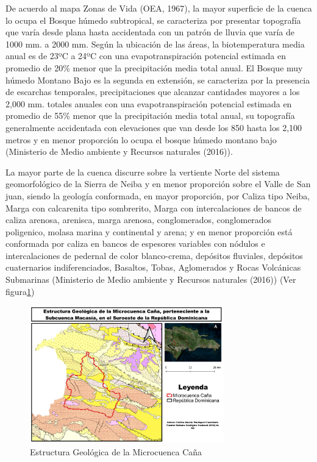 \documentclass[11pt,]{article}
\begin{document}
De acuerdo al mapa Zonas de Vida (OEA, 1967), la mayor superficie de la
cuenca lo ocupa el Bosque húmedo subtropical, se caracteriza por
presentar topografía que varía desde plana hasta accidentada con un
patrón de lluvia que varía de 1000 mm. a 2000 mm. Según la ubicación de
las áreas, la biotemperatura media anual es de 23ºC a 24ºC con una
evapotranspiración potencial estimada en promedio de 20\% menor que la
precipitación media total anual. El Bosque muy húmedo Montano Bajo es la
segunda en extensión, se caracteriza por la presencia de escarchas
temporales, precipitaciones que alcanzar cantidades mayores a los 2,000
mm. totales anuales con una evapotranspiración potencial estimada en
promedio de 55\% menor que la precipitación media total anual, su
topografía generalmente accidentada con elevaciones que van desde los
850 hasta los 2,100 metros y en menor proporción lo ocupa el bosque
húmedo montano bajo (Ministerio de Medio ambiente y Recursos naturales
(2016)).

La mayor parte de la cuenca discurre sobre la vertiente Norte del
sistema geomorfológico de la Sierra de Neiba y en menor proporción sobre
el Valle de San juan, siendo la geología conformada, en mayor
proporción, por Caliza tipo Neiba, Marga con calcarenita tipo
sombrerito, Marga con intercalaciones de bancos de caliza arenosa,
arenisca, marga arenosa, conglomerados, conglomerados poligenico, molasa
marina y continental y arena; y en menor proporción está conformada por
caliza en bancos de espesores variables con nódulos e intercalaciones de
pedernal de color blanco-crema, depósitos fluviales, depósitos
cuaternarios indiferenciados, Basaltos, Tobas, Aglomerados y Rocas
Volcánicas Submarinas (Ministerio de Medio ambiente y Recursos naturales
(2016)) (Ver figura\ref{mapageologico})

\begin{figure}
\centering
\includegraphics[width=0.75000\textwidth]{mapa_geologico_cuenca_cana.jpg}
\caption{Estructura Geológica de la Microcuenca
Caña\label{mapageologico}}
\end{figure}
\end{document}
